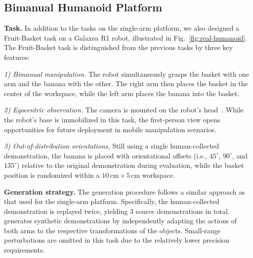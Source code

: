 
\subsection{Bimanual Humanoid Platform}



\noindent\textbf{Task.}
In addition to the tasks on the single-arm platform, we also designed a Fruit-Basket task on a Galaxea R1 robot, illustrated in Fig.~\ref{fig:real-humanoid}. The Fruit-Basket task is distinguished from the previous tasks by three key features: 

\textit{1) Bimanual manipulation.} The robot simultaneously grasps the basket with one arm and the banana with the other. The right arm then places the basket in the center of the workspace, while the left arm places the banana into the basket. 

\textit{2) Egocentric observation.} The camera is mounted on the robot's head~\cite{ze2024generalizable}. While the robot’s base is immobilized in this task, the first-person view opens opportunities for future deployment in mobile manipulation scenarios. 

\textit{3) Out-of-distribution orientations.} Still using a single human-collected demonstration, the banana is placed with orientational offsets (i.e., $45^\circ$, $90^\circ$, and $135^\circ$) relative to the original demonstration during evaluation, while the basket position is randomized within a $10\,\textrm{cm} \times 5\,\textrm{cm}$ workspace.






\vspace{0.2cm} \noindent\textbf{Generation strategy.}
The generation procedure follows a similar approach as that used for the single-arm platform. Specifically, the human-collected demonstration is replayed twice, yielding $3$ source demonstrations in total. \method generates synthetic demonstrations by independently adapting the actions of both arms to the respective transformations of the objects. Small-range perturbations are omitted in this task due to the relatively lower precision requirements.

